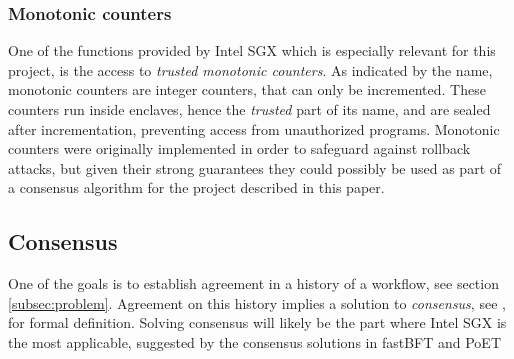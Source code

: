 \documentclass[12pt]{article}
\begin{document}



			\subsubsection{Monotonic counters}
			One of the functions provided by Intel SGX which is especially relevant for this project, is the access to \textit{trusted monotonic counters}.
			As indicated by the name, monotonic counters are integer counters, that can only be incremented.
			These counters run inside enclaves, hence the \textit{trusted} part of its name, and are sealed after incrementation, preventing access from unauthorized programs.
			Monotonic counters were originally implemented in order to safeguard against rollback attacks, but given their strong guarantees they could possibly be used as part of a consensus algorithm for the project described in this paper.

		\subsection{Consensus}
		One of the goals is to establish agreement in a history of a workflow, see section \ref{subsec:problem}. Agreement on this history implies a solution to \textit{consensus}, see \cite{mds-book}, for formal definition.
		Solving consensus will likely be the part where Intel SGX is the most applicable, suggested by the consensus solutions in fastBFT \cite{fastbft} and PoET \cite{poet}
\end{document}
